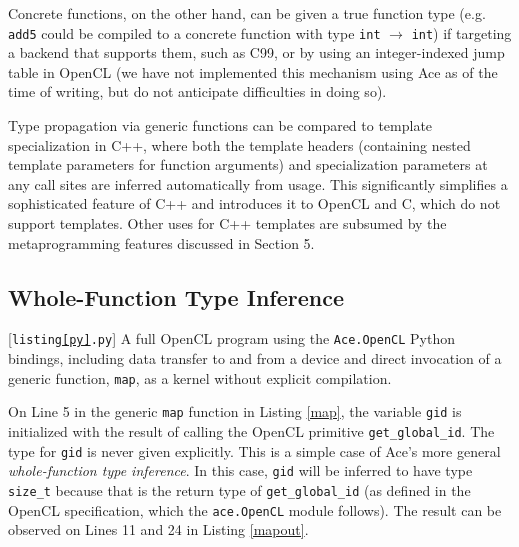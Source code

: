 \documentclass[9pt,preprint]{sigplanconf}
\begin{document}
Concrete functions, on the other hand, can be given a true function type (e.g. \verb|add5| could be compiled to a concrete function with type \verb|int| $\rightarrow$ \verb|int|) if targeting a backend that supports them, such as C99, or by using an integer-indexed jump table in OpenCL (we have not implemented this mechanism using Ace as of the time of writing, but do not anticipate difficulties in doing so).

Type propagation via generic functions can be compared to template specialization in C++, where both the template headers (containing nested template parameters for function arguments) and specialization parameters at any call sites are inferred automatically from usage. This significantly simplifies a sophisticated feature of C++ and introduces it to OpenCL and C, which do not support templates. Other uses for C++ templates are subsumed by the metaprogramming features discussed in Section 5.

\subsection{Whole-Function Type Inference}
\begin{codelisting}

\caption{[\texttt{listing\ref{py}.py}] A full OpenCL program using the \texttt{Ace.OpenCL} Python bindings, including data transfer to and from a device and direct invocation of a generic function, \texttt{map}, as a kernel without explicit compilation.}
\label{py}
\end{codelisting}

%

On Line 5 in the generic \verb|map| function in Listing \ref{map}, the variable \verb|gid| is initialized with the result of calling the OpenCL primitive \verb|get_global_id|.  The type for \verb|gid| is never given explicitly. This is a simple case of Ace's more general {\em whole-function type inference}. In this case, \verb|gid| will be inferred to have type \verb|size_t| because that is the return type of \verb|get_global_id| (as defined in the OpenCL specification, which the \verb|ace.OpenCL| module follows). The result can be observed on Lines 11 and 24 in Listing \ref{mapout}. 
\end{document}
